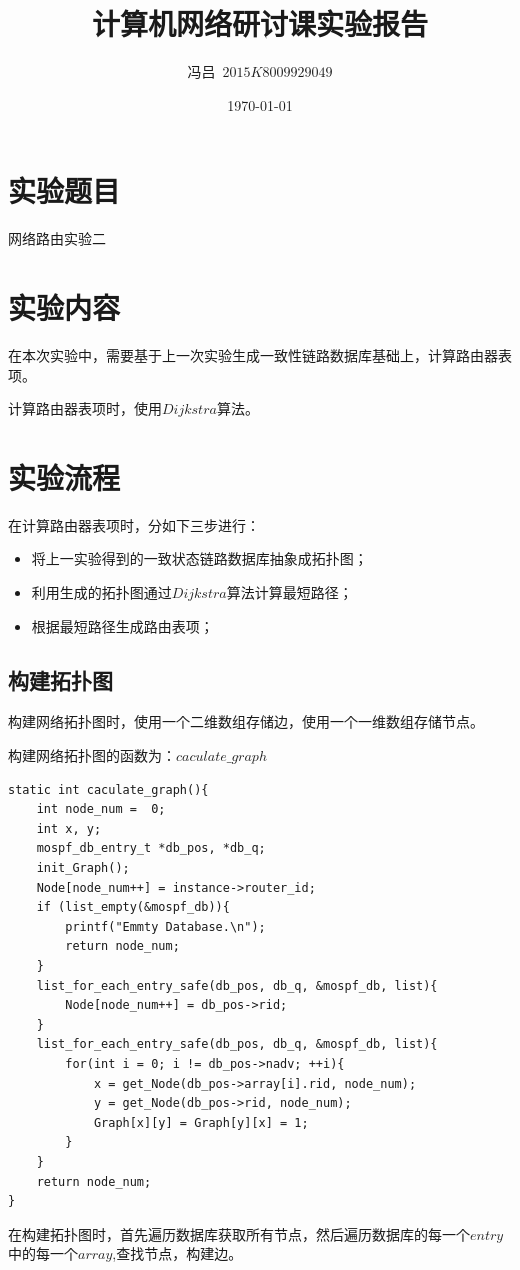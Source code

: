 \documentclass[UTF8,noindent]{ctexart}
\title{\CJKfamily{zhkai}计算机网络研讨课实验报告}
\author{{\CJKfamily{zhkai}冯吕}\ $2015K8009929049$}
\date{\today}
\begin{document}
\maketitle
{}
\section*{{实验题目}}网络路由实验二
\section*{{实验内容}}
在本次实验中，需要基于上一次实验生成一致性链路数据库基础上，计算路由器表项。

计算路由器表项时，使用$Dijkstra$算法。
\section*{{实验流程}}
在计算路由器表项时，分如下三步进行：
\begin{itemize}
  \item 将上一实验得到的一致状态链路数据库抽象成拓扑图；
	\item 利用生成的拓扑图通过$Dijkstra$算法计算最短路径；
	  \item 根据最短路径生成路由表项；
\end{itemize}
\subsection*{构建拓扑图}
构建网络拓扑图时，使用一个二维数组存储边，使用一个一维数组存储节点。

构建网络拓扑图的函数为：$caculate\_graph$
\begin{lstlisting}
static int caculate_graph(){
	int node_num =  0;
	int x, y;
	mospf_db_entry_t *db_pos, *db_q;
	init_Graph();
	Node[node_num++] = instance->router_id;
	if (list_empty(&mospf_db)){
		printf("Emmty Database.\n");
		return node_num;
	}
	list_for_each_entry_safe(db_pos, db_q, &mospf_db, list){
		Node[node_num++] = db_pos->rid;
	}
	list_for_each_entry_safe(db_pos, db_q, &mospf_db, list){
		for(int i = 0; i != db_pos->nadv; ++i){
			x = get_Node(db_pos->array[i].rid, node_num);
			y = get_Node(db_pos->rid, node_num);
			Graph[x][y] = Graph[y][x] = 1;
		}
	}
	return node_num;
}
\end{lstlisting}
在构建拓扑图时，首先遍历数据库获取所有节点，然后遍历数据库的每一个$entry$中的每一个$array$,查找节点，构建边。
\end{document}
